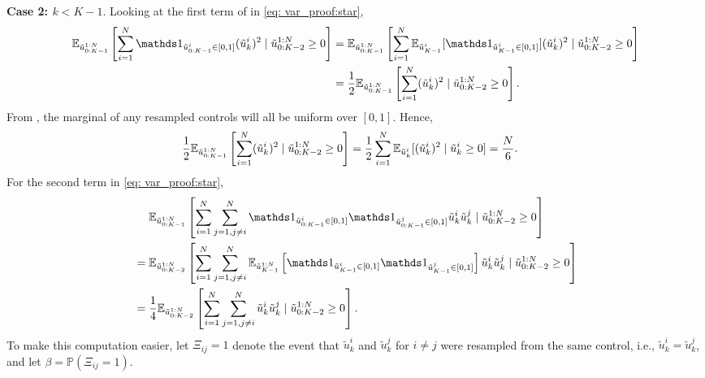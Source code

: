 \vspace{.5\baselineskip}

\noindent\textbf{Case 2: $k < K-1$}.
Looking at the first term of \circled{$\star$} in \eqref{eq: var_proof:star},
\begin{align}
    \E_{\tilde{u}_{0:K-1}^{1:N}}\left[
        \sum_{i=1}^N \ind{\tilde{u}^i_{0:K-1} \in [0, 1]} (\tilde{u}^i_k)^2
        \mid \tilde{u}_{0:K-2}^{1:N} \geq 0
    \right]
    &= \E_{\tilde{u}_{0:K-1}^{1:N}}\left[
        \sum_{i=1}^N \E_{\tilde{u}^i_{K-1}}[ \ind{\tilde{u}^i_{K-1} \in [0, 1]} ] (\tilde{u}^i_k)^2
        \mid \tilde{u}_{0:K-2}^{1:N} \geq 0
    \right] \\
    &= \frac{1}{2} \E_{\tilde{u}_{0:K-1}^{1:N}}\left[
        \sum_{i=1}^N (\tilde{u}^i_k)^2
        \mid \tilde{u}_{0:K-2}^{1:N} \geq 0
    \right].
\end{align}
From , the marginal of any resampled controls will all be uniform over $[0, 1]$. Hence,
\begin{align}
    \frac{1}{2} \mathbb{E}_{\tilde{u}_{0:K-1}^{1:N}}\left[
        \sum_{i=1}^N (\tilde{u}^i_k)^2
        \mid \tilde{u}_{0:K-2}^{1:N} \geq 0
    \right]
    &= \frac{1}{2} \sum_{i=1}^N \mathbb{E}_{\tilde{u}_k^i}[ (\tilde{u}_k^i)^2 \mid \tilde{u}_{k}^{i} \geq 0] = \frac{N}{6}.\label{eq:term3}
\end{align}
For the second term in \eqref{eq: var_proof:star},
\begin{align}
    &\mathrel{\phantom{=}} \E_{\tilde{u}_{0:K-1}^{1:N}}\left[
        \sum_{i=1}^N \sum_{j=1, j\not=i}^N \ind{\tilde{u}^i_{0:K-1} \in [0, 1]} \ind{\tilde{u}^j_{0:K-1} \in [0, 1]} \tilde{u}^i_k \tilde{u}^j_k
        \mid \tilde{u}_{0:K-2}^{1:N} \geq 0
    \right] \\
    &= \E_{\tilde{u}_{0:K-2}^{1:N}}\left[
        \sum_{i=1}^N \sum_{j=1, j\not=i}^N \E_{\tilde{u}_{K-1}^{1:N}}\left[ \ind{\tilde{u}^i_{K-1} \in [0, 1]} \ind{\tilde{u}^j_{K-1} \in [0, 1]} \right] \tilde{u}^i_k \tilde{u}^j_k
        \mid \tilde{u}_{0:K-2}^{1:N} \geq 0
    \right] \\
    &= \frac{1}{4} \E_{\tilde{u}_{0:K-2}^{1:N}}\left[
        \sum_{i=1}^N \sum_{j=1, j\not=i}^N \tilde{u}^i_k \tilde{u}^j_k
        \mid \tilde{u}_{0:K-2}^{1:N} \geq 0
    \right]. \label{eq: var_proof:tmp1}
\end{align}
To make this computation easier, let $\Xi_{ij}=1$ denote the event that $\tilde{u}^i_k$ and $\tilde{u}^j_k$ for $i \not= j$ were resampled from the same control, i.e., $\tilde{u}^i_k = \tilde{u}^j_k$, and let $\beta = \mathbb{P}(\Xi_{ij}=1)$.
